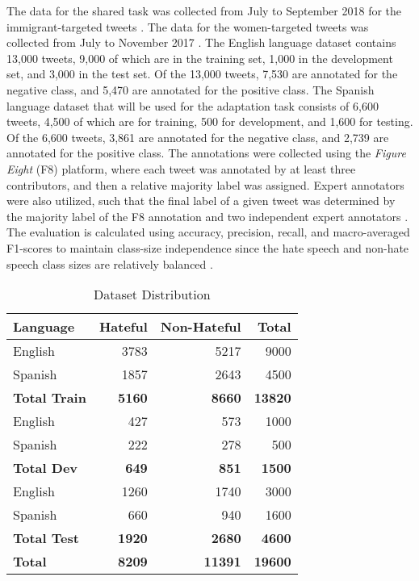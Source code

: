 \documentclass[11pt,a4paper]{article}
\begin{document}
   The data for the shared task was collected from July to September 2018 for the immigrant-targeted tweets \citep{basile-etal-2019-semeval}. The data for the women-targeted tweets was collected from July to November 2017 \citep{fersini2018overview}. The English language dataset contains 13,000 tweets, 9,000 of which are in the training set, 1,000 in the development set, and 3,000 in the test set. Of the 13,000 tweets, 7,530 are annotated for the negative class, and 5,470 are annotated for the positive class. The Spanish language dataset that will be used for the adaptation task consists of 6,600 tweets, 4,500 of which are for training, 500 for development, and 1,600 for testing. Of the 6,600 tweets, 3,861 are annotated for the negative class, and 2,739 are annotated for the positive class. The annotations were collected using the \textit{Figure Eight} (F8) platform, where each tweet was annotated by at least three contributors, and then a relative majority label was assigned. Expert annotators were also utilized, such that the final label of a given tweet was determined by the majority label of the F8 annotation and two independent expert annotators \citep{basile-etal-2019-semeval}. The evaluation is calculated using accuracy, precision, recall, and macro-averaged F1-scores to maintain class-size independence since the hate speech and non-hate speech class sizes are relatively balanced \citep{basile-etal-2019-semeval}.



\begin{table}[h]
    \label{tab:dataset}
    
  \centering
  \caption{Dataset Distribution}
    \begin{tabular}{|l|r|r|r|}
    \hline
    \textbf{Language} & \textbf{Hateful} & \textbf{Non-Hateful} & \textbf{Total} \\
    \hline
    English & 3783  & 5217  & 9000  \\
    Spanish & 1857  & 2643  & 4500  \\
    \hline
    \textbf{Total Train} & \textbf{5160} & \textbf{8660} & \textbf{13820} \\
    \hline
    English & 427   & 573   & 1000  \\
    Spanish & 222   & 278   & 500   \\
    \hline
    \textbf{Total Dev} & \textbf{649} & \textbf{851} & \textbf{1500} \\
    \hline
    English & 1260  & 1740  & 3000  \\
    Spanish & 660   & 940   & 1600  \\
    \hline
    \textbf{Total Test} & \textbf{1920} & \textbf{2680} & \textbf{4600} \\
    \hline
    \textbf{Total} & \textbf{8209} & \textbf{11391} & \textbf{19600} \\
    \hline
    \end{tabular}%
  \label{tab:dataset-distribution}%
\end{table}%
\end{document}
